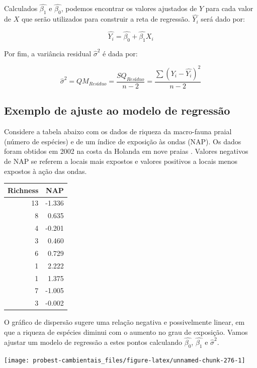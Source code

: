 \documentclass[
]{book}
\begin{document}
Calculados \(\hat{\beta_1}\) e \(\hat{\beta_0}\), podemos encontrar os valores ajustados de \(Y\) para cada valor de \(X\) que serão utilizados para construir a reta de regressão. \(\hat{Y_i}\) será dado por:

\[\hat{Y_i} = \hat{\beta_0} + \hat{\beta_1}X_i\]

Por fim, a variância residual \(\hat{\sigma}^2\) é dada por:

\[\hat{\sigma}^2 = QM_{Resíduo} = \frac{SQ_{Resíduo}}{n-2} = \frac{\sum{(Y_i-\hat{Y_ i})^2}}{n-2}\]

\hypertarget{exemplo-de-ajuste-ao-modelo-de-regressuxe3o}{%
\subsection{Exemplo de ajuste ao modelo de regressão}\label{exemplo-de-ajuste-ao-modelo-de-regressuxe3o}}

Considere a tabela abaixo com os dados de riqueza da macro-fauna praial (número de espécies) e de um índice de exposição às ondas (NAP). Os dados foram obtidos em 2002 na costa da Holanda em nove praias \citep{zuur2009mixed}. Valores negativos de NAP se referem a locais mais expostos e valores positivos a locais menos expostos à ação das ondas.

\begin{tabular}{r|r}
\hline
Richness & NAP\\
\hline
13 & -1.336\\
\hline
8 & 0.635\\
\hline
4 & -0.201\\
\hline
3 & 0.460\\
\hline
6 & 0.729\\
\hline
1 & 2.222\\
\hline
1 & 1.375\\
\hline
7 & -1.005\\
\hline
3 & -0.002\\
\hline
\end{tabular}

O gráfico de dispersão sugere uma relação negativa e possivelmente linear, em que a riqueza de espécies diminui com o aumento no grau de exposição. Vamos ajustar um modelo de regressão a estes pontos calculando \(\hat{\beta_0}\), \(\hat{\beta_1}\) e \(\hat{\sigma}^2\).

\begin{center}\texttt{[image: probest-cambientais\_files/figure-latex/unnamed-chunk-276-1]} \end{center}
\end{document}
